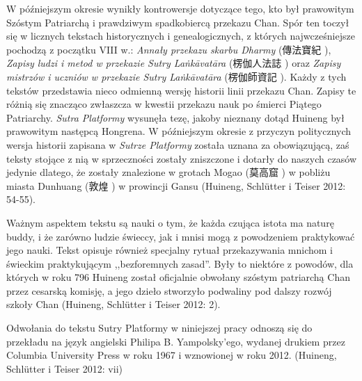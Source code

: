 W późniejszym okresie wynikły kontrowersje dotyczące tego, kto był prawowitym Szóstym Patriarchą i prawdziwym spadkobiercą przekazu Chan. Spór ten toczył się w licznych tekstach historycznych i genealogicznych, z których najwcześniejsze pochodzą z początku VIII w.: \textit{Annały przekazu skarbu Dharmy} (傳法寶紀 ), \textit{Zapisy ludzi i metod w przekazie Sutry Laṅkāvatāra} (楞伽人法誌 ) oraz \textit{Zapisy mistrzów i uczniów w przekazie Sutry Laṅkāvatāra} (楞伽師資記 ). Każdy z tych tekstów przedstawia nieco odmienną wersję historii linii przekazu Chan. Zapisy te różnią się znacząco zwłaszcza w kwestii przekazu nauk po śmierci Piątego Patriarchy. \textit{Sutra Platformy} wysunęła tezę, jakoby nieznany dotąd Huineng był prawowitym następcą Hongrena. W późniejszym okresie z przyczyn politycznych wersja historii zapisana w \textit{Sutrze Platformy} została uznana za obowiązującą, zaś teksty stojące z nią w sprzeczności zostały zniszczone i dotarły do naszych czasów jedynie dlatego, że zostały znalezione w grotach Mogao (莫高窟 ) w pobliżu miasta Dunhuang (敦煌 ) w prowincji Gansu (Huineng, Schlütter i Teiser 2012: 54-55).

Ważnym aspektem tekstu są nauki o tym, że każda czująca istota ma naturę buddy, i że zarówno ludzie świeccy, jak i mnisi mogą z powodzeniem praktykować jego nauki. Tekst opisuje również specjalny rytuał przekazywania mnichom i świeckim praktykującym ,,bezforemnych zasad''. %
Były to niektóre z powodów, dla których w roku 796 Huineng został oficjalnie obwołany szóstym patriarchą Chan przez cesarską komisję, a jego dzieło stworzyło podwaliny pod dalszy rozwój szkoły Chan (Huineng, Schlütter i Teiser 2012: 2).

Odwołania do tekstu Sutry Platformy w niniejszej pracy odnoszą się do przekładu na język angielski Philipa B. Yampolsky'ego, wydanej drukiem przez Columbia University Press w roku 1967 i wznowionej w roku 2012.
(Huineng, Schlütter i Teiser 2012: vii)
